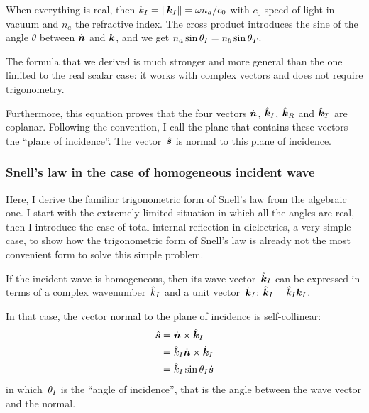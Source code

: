 When everything is real, then $k_\I=\norm{\vect{k}_\I}=\omega n_a / c_0$ with $c_0$ speed of light in vacuum and $n_a$ the refractive index.
The cross product introduces the sine of the angle $\theta$ between $\dot{\bm{n}}$ and $\bm{k}$, and we get
$n_a \sin{\theta_I} = n_b \sin{\theta_T}$.

The formula that we derived is much stronger and more general than the one limited to the real scalar case: it works with complex vectors and does not require trigonometry.

Furthermore, this equation proves that the four vectors $\dot{\bm{n}}$, $\hat{\bm{k}}_I$, $\hat{\bm{k}}_R$ and $\hat{\bm{k}}_T$ are coplanar.
Following the convention, I call the plane that contains these vectors the ``plane of incidence''.
The vector~$\hat{\bm{s}}$ is normal to this plane of incidence.

\subsubsection{Snell's law in the case of homogeneous incident wave}
Here, I derive the familiar trigonometric form of Snell's law from the algebraic one.
I start with the extremely limited situation in which all the angles are real, then I introduce the case of total internal reflection in dielectrics, a very simple case, to show how the trigonometric form of Snell's law is already not the most convenient form to solve this simple problem.

If the incident wave is homogeneous, then its
wave vector~$\hat{\bm{k}}_I$ can be expressed in terms of a complex wavenumber~$\hat{k}_I$ and a unit vector~$\dot{\bm{k}}_I$: $\hat{\bm{k}}_I = \hat{k}_I \dot{\bm{k}}_I$.

In that case, the vector normal to the plane of incidence is self-collinear:
\begin{subequations}
    \begin{align}
        \hat{\bm{s}}
        &=
        \dot{\bm{n}} \times \hat{\bm{k}}_I
        \\
        &= \hat{k}_I \dot{\bm{n}} \times \dot{\bm{k}}_I
        \\
        &= \hat{k}_I \sin \theta_I \dot{\bm{s}}
    \end{align}
\end{subequations}
in which~$\theta_I$ is the ``angle of incidence'', that is the angle between the wave vector and the normal.

